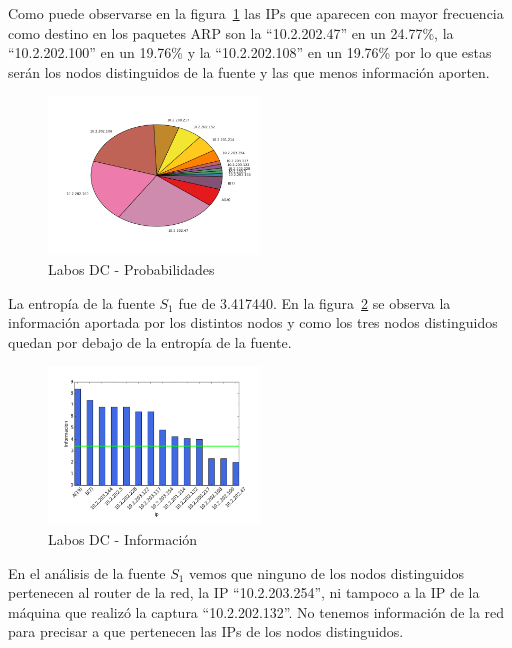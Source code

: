 \documentclass[final,inline,narroweqnarray,a4paper]{ieee}
\begin{document}
Como puede observarse en la figura~\ref{torta:laboDcS1} las IPs que aparecen con mayor frecuencia como destino en los paquetes ARP son la ``10.2.202.47'' en un 24.77\%, la ``10.2.202.100'' en un 19.76\% y la ``10.2.202.108'' en un 19.76\% por lo que estas serán los nodos distinguidos de la fuente y las que menos información aporten.

\begin{figure}[H]
    \begin{center}
        \includegraphics[width=0.5\textwidth]{plot/laboDcS1-pie.png}
        \caption{Labos DC - Probabilidades}
        \label{torta:laboDcS1}
    \end{center}
\end{figure} 

La entropía de la fuente $S_1$ fue de 3.417440. En la figura~\ref{histo:laboDcS1} se observa la información aportada por los distintos nodos y como los tres nodos distinguidos quedan por debajo de la entropía de la fuente. 

\begin{figure}[H]
    \begin{center}
        \includegraphics[width=0.5\textwidth]{plot/laboDcS1-bar.png}
        \caption{Labos DC - Información}
        \label{histo:laboDcS1}
    \end{center}
\end{figure}

En el análisis de la fuente $S_1$ vemos que ninguno de los nodos distinguidos pertenecen al router de la red, la IP ``10.2.203.254'', ni tampoco a la IP de la máquina que realizó la captura ``10.2.202.132''. No tenemos información de la red para precisar a que pertenecen las IPs de los nodos distinguidos.
\end{document}
